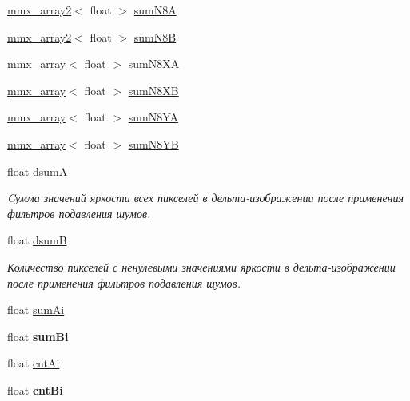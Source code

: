 \begin{DoxyCompactItemize}
\item 
\hyperlink{classmmx__array2}{mmx\+\_\+array2}$<$ float $>$ \hyperlink{struct_c_v_i_engine_thread_1_1tag_t_m_p___s_t_a_t_a6c0472a126415ba66980138167200ee1}{sum\+N8\+A}
\item 
\hyperlink{classmmx__array2}{mmx\+\_\+array2}$<$ float $>$ \hyperlink{struct_c_v_i_engine_thread_1_1tag_t_m_p___s_t_a_t_ae90f5230a0ab3cdda9f8952d2643bc2b}{sum\+N8\+B}
\item 
\hyperlink{classmmx__array}{mmx\+\_\+array}$<$ float $>$ \hyperlink{struct_c_v_i_engine_thread_1_1tag_t_m_p___s_t_a_t_a42baad2ced89f599cbb1a1c393657a5e}{sum\+N8\+X\+A}
\item 
\hyperlink{classmmx__array}{mmx\+\_\+array}$<$ float $>$ \hyperlink{struct_c_v_i_engine_thread_1_1tag_t_m_p___s_t_a_t_afc12e71a53d3c48e1cdffcd0a87a6e25}{sum\+N8\+X\+B}
\item 
\hyperlink{classmmx__array}{mmx\+\_\+array}$<$ float $>$ \hyperlink{struct_c_v_i_engine_thread_1_1tag_t_m_p___s_t_a_t_ab51541bbc40f9e0e4a29beb43e8616e1}{sum\+N8\+Y\+A}
\item 
\hyperlink{classmmx__array}{mmx\+\_\+array}$<$ float $>$ \hyperlink{struct_c_v_i_engine_thread_1_1tag_t_m_p___s_t_a_t_a6528ccd41f3f8149da880e6d6ce20b08}{sum\+N8\+Y\+B}
\item 
float \hyperlink{struct_c_v_i_engine_thread_1_1tag_t_m_p___s_t_a_t_a23e5c889258c787d09e9176b8f6d670c}{dsum\+A}
\begin{DoxyCompactList}\small\item\em Cумма значений яркости всех пикселей в дельта-\/изображении после применения фильтров подавления шумов. \end{DoxyCompactList}\item 
float \hyperlink{struct_c_v_i_engine_thread_1_1tag_t_m_p___s_t_a_t_ae754be6a110348618402ce40f495a3a2}{dsum\+B}
\begin{DoxyCompactList}\small\item\em Количество пикселей с ненулевыми значениями яркости в дельта-\/изображении после применения фильтров подавления шумов. \end{DoxyCompactList}\item 
float \hyperlink{struct_c_v_i_engine_thread_1_1tag_t_m_p___s_t_a_t_a81b73bf1a21f7b5ca9235ec5e2cd1f90}{sum\+Ai}
\item 
\hypertarget{struct_c_v_i_engine_thread_1_1tag_t_m_p___s_t_a_t_a24a306060f8d7911ee7192cac265523f}{float {\bfseries sum\+Bi}}\label{struct_c_v_i_engine_thread_1_1tag_t_m_p___s_t_a_t_a24a306060f8d7911ee7192cac265523f}

\item 
float \hyperlink{struct_c_v_i_engine_thread_1_1tag_t_m_p___s_t_a_t_ad5c691a4f5a4dca0c461909bd5dd27a7}{cnt\+Ai}
\item 
\hypertarget{struct_c_v_i_engine_thread_1_1tag_t_m_p___s_t_a_t_a4e1fc8a04fbf22508774ecdf52ff8d28}{float {\bfseries cnt\+Bi}}\label{struct_c_v_i_engine_thread_1_1tag_t_m_p___s_t_a_t_a4e1fc8a04fbf22508774ecdf52ff8d28}

\end{DoxyCompactItemize}


